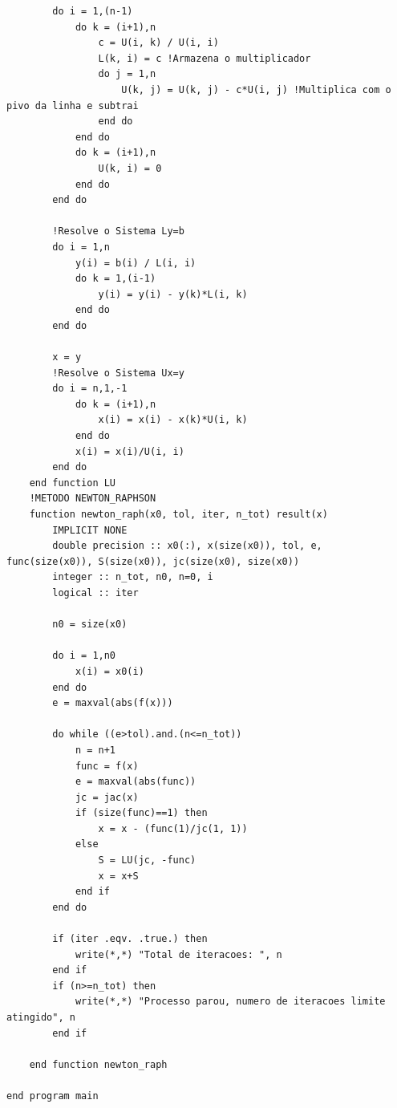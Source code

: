 \documentclass[a4paper, 12pt, openright, oneside]{article}
\begin{document}
\begin{lstlisting}
        do i = 1,(n-1)
            do k = (i+1),n
                c = U(i, k) / U(i, i)
                L(k, i) = c !Armazena o multiplicador
                do j = 1,n
                    U(k, j) = U(k, j) - c*U(i, j) !Multiplica com o pivo da linha e subtrai
                end do
            end do
            do k = (i+1),n
                U(k, i) = 0
            end do
        end do

        !Resolve o Sistema Ly=b
        do i = 1,n
            y(i) = b(i) / L(i, i)
            do k = 1,(i-1)
                y(i) = y(i) - y(k)*L(i, k)
            end do
        end do

        x = y
        !Resolve o Sistema Ux=y
        do i = n,1,-1
            do k = (i+1),n
                x(i) = x(i) - x(k)*U(i, k)
            end do
            x(i) = x(i)/U(i, i)
        end do
    end function LU
    !METODO NEWTON_RAPHSON
    function newton_raph(x0, tol, iter, n_tot) result(x)
        IMPLICIT NONE
        double precision :: x0(:), x(size(x0)), tol, e, func(size(x0)), S(size(x0)), jc(size(x0), size(x0))
        integer :: n_tot, n0, n=0, i
        logical :: iter

        n0 = size(x0)

        do i = 1,n0
            x(i) = x0(i)
        end do
        e = maxval(abs(f(x)))

        do while ((e>tol).and.(n<=n_tot))
            n = n+1
            func = f(x)
            e = maxval(abs(func))
            jc = jac(x)
            if (size(func)==1) then
                x = x - (func(1)/jc(1, 1))
            else
                S = LU(jc, -func)
                x = x+S
            end if
        end do

        if (iter .eqv. .true.) then
            write(*,*) "Total de iteracoes: ", n
        end if
        if (n>=n_tot) then
            write(*,*) "Processo parou, numero de iteracoes limite atingido", n
        end if

    end function newton_raph

end program main

\end{lstlisting}
\newpage
\end{document}
